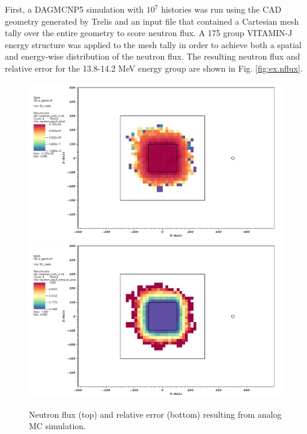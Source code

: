 First, a DAGMCNP5 \cite{dagmc} simulation with $10^7$ histories was run using 
the CAD geometry generated by Trelis and an input
file that contained a Cartesian mesh tally over the entire geometry to score
neutron flux.  A 175 group VITAMIN-J energy structure
\cite{vitaminj} was applied to the mesh tally 
in order to achieve both a spatial and energy-wise distribution of the neutron
flux.  The resulting
neutron flux and relative error for the 13.8-14.2 MeV energy group are shown in
Fig. \ref{fig:ex.nflux}.
\begin{figure} 
	\includegraphics[scale=0.4] {figs/analog_tot_n_f.png}
	\includegraphics[scale=0.4] {figs/analog_tot_n_err.png}
	\caption [Analog neutron flux and error] 
	{Neutron flux (top) and relative error (bottom) resulting from analog MC simulation.\label{fig:ex.ana_nflux}}
\end{figure}

